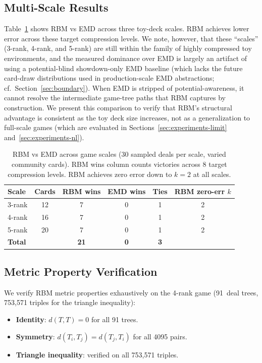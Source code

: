 \documentclass[11pt]{article}
\begin{document}
\subsection{Multi-Scale Results}

Table~\ref{tab:multiscale} shows RBM vs EMD across three toy-deck scales.
RBM achieves lower error across these target compression levels.
We note, however, that these ``scales'' (3-rank, 4-rank, and 5-rank) are
still within the family of highly compressed toy environments, and the
measured dominance over EMD is largely an artifact of using a
potential-blind showdown-only EMD baseline (which lacks the future card-draw
distributions used in production-scale EMD abstractions; cf.\
Section~\ref{sec:boundary}). When EMD is stripped of potential-awareness,
it cannot resolve the intermediate game-tree paths that RBM captures
by construction. We present this comparison to verify that RBM's structural
advantage is consistent as the toy deck size increases, not as a
generalization to full-scale games (which are evaluated in
Sections~\ref{sec:experiments-limit} and~\ref{sec:experiments-nl}).

\begin{table}[t]
\centering
\caption{RBM vs EMD across game scales (30 sampled deals per scale,
varied community cards). RBM wins column counts victories across 8
target compression levels. RBM achieves zero error down to $k=2$
at all scales.}
\label{tab:multiscale}
\begin{tabular}{lccccc}
\toprule
Scale & Cards & RBM wins & EMD wins & Ties & RBM zero-err $k$ \\
\midrule
3-rank & 12 & 7 & 0 & 1 & 2 \\
4-rank & 16 & 7 & 0 & 1 & 2 \\
5-rank & 20 & 7 & 0 & 1 & 2 \\
\midrule
\textbf{Total} & & \textbf{21} & \textbf{0} & \textbf{3} & \\
\bottomrule
\end{tabular}
\end{table}

\subsection{Metric Property Verification}

We verify RBM metric properties exhaustively on the 4-rank game
(91~deal trees, 753,571 triples for the triangle inequality):

\begin{itemize}[nosep]
  \item \textbf{Identity}: $d(T, T) = 0$ for all 91 trees. \checkmark
  \item \textbf{Symmetry}: $d(T_i, T_j) = d(T_j, T_i)$ for all 4095
    pairs. \checkmark
  \item \textbf{Triangle inequality}: verified on all 753,571 triples.
    \checkmark
\end{itemize}
\end{document}
